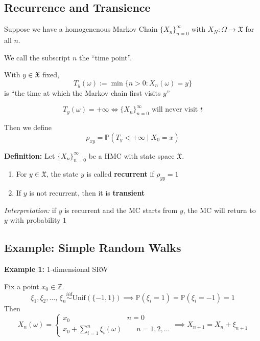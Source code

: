 \documentclass[12pt]{article}
\renewcommand{\P}{\mathbb{P}}
\newcommand{\mfX}{\mathfrak{X}}
\newcommand{\Z}{\mathbb{Z}}
\begin{document}
\subsection{Recurrence and Transience}
Suppose we have a homogenenous Markov Chain $\{X_n\}_{n=0}^\infty$ with $X_N: \Omega \to \mfX$ for all $n$.

\begin{center}
\end{center}

We call the subscript $n$ the ``time point''. 

With $y \in \mfX$ fixed, 
\[T_y(\omega) := \min\{n > 0: X_n(\omega) = y\}\]
is ``the time at which the Markov chain first visits $y$''

\[T_y(\omega) = +\infty \iff \{X_n\}_{n=0}^\infty \text{ will never visit $t$}\]

Then we define 
\[\rho_{xy} = \P(T_y < +\infty \; | \; X_0 = x)\]

\textbf{Definition:} Let $\{X_n\}_{n=0}^\infty$ be a HMC with state space $\mfX$. 
\begin{enumerate}
    \item For $y \in \mfX$, the state $y$ is called \textbf{recurrent} if $\rho_{yy} = 1$
    \item If $y$ is not recurrent, then it is \textbf{transient}
\end{enumerate}

\emph{Interpretation:} if $y$ is recurrent and the MC starts from $y$, the MC will return to $y$ with probability $1$

\subsection{Example: Simple Random Walks}
\textbf{Example 1:} 1-dimensional SRW 

Fix a point $x_0 \in \Z$. 
\[\xi_1, \xi_2, \dots,\, \xi_n \overset{iid}{\sim} \text{Unif}(\{-1, 1\}) \implies \P(\xi_i = 1) = \P(\xi_i = -1) = 1\]
Then 
\[X_n(\omega) = \begin{cases}
    x_0 \qquad\qquad \qquad\qquad\!  n = 0\\
    x_0 + \sum_{i=1}^n \xi_i(\omega) \qquad n = 1, 2, \dots
\end{cases} \implies X_{n+1} = X_n + \xi_{n+1}\]
\end{document}
